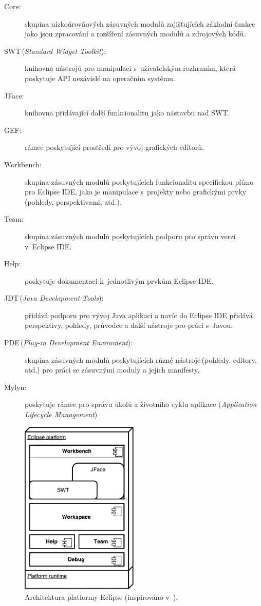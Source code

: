   \begin{description}
    \item[Core:] skupina nízkoúrovňových zásuvných modulů zajišťujících základní funkce jako jsou zpracování a rozšíření zásuvných modulů a zdrojových kódů.
    \item[SWT\,(\emph{Standard Widget Toolkit}):] knihovna nástrojů pro manipulaci s~uživatelským rozhraním, která poskytuje API nezávislé na operačním systému.
    \item[JFace:] knihovna přidávající další funkcionalitu jako nástavbu nad SWT.
    \item[GEF:] rámec poskytující prostředí pro vývoj grafických editorů.
    \item[Workbench:] skupina zásuvných modulů poskytujících funkcionalitu specifickou přímo pro Eclipse IDE, jako je manipulace s~projekty nebo grafickými prvky (pohledy, perspektivami, atd.).
    \item[Team:] skupina zásuvných modulů poskytujících podporu pro správu verzí v~Eclipse IDE.
    \item[Help:] poskytuje dokumentaci k~jednotlivým prvkům Eclipse IDE.
    \item[JDT\,(\emph{Java Development Tools})\footnotemark:]  přidává podporu pro vývoj Java aplikací a navíc do Eclipse IDE přidává perspektivy, pohledy, průvodce a další nástroje pro práci s~Javou.
    \item[PDE\,(\emph{Plug-in Development Enviroment})\footnotemark:]  skupina zásuvných modulů poskytujících různé nástroje\,(pohledy, editory, atd.) pro práci se zásuvnými moduly a jejich manifesty.
    \item[Mylyn:] poskytuje rámec pro správu úkolů a životního cyklu aplikace (\emph{Application Lifecycle Management})
  \end{description}

  \begin{figure}
    \includegraphics[width=0.5\textwidth, center]{obrazky-figures/eclipse_arch.pdf}
    \caption[Architektura platformy Eclipse.]{Architektura platformy Eclipse (inspirováno v~\cite{eclipse-platform}).}
    \label{fig:eclipse_arch}
  \end{figure}

